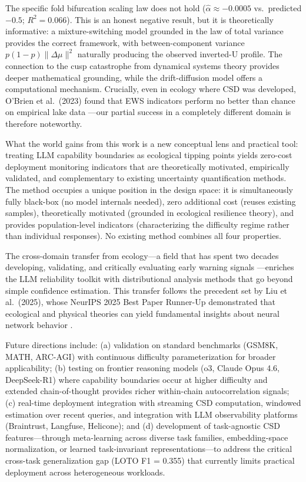 \documentclass[11pt,letterpaper]{article}
\begin{document}
The specific fold bifurcation scaling law does not hold ($\hat{\alpha} \approx -0.0005$ vs.\ predicted $-0.5$; $R^2 = 0.066$). This is an honest negative result, but it is theoretically informative: a mixture-switching model grounded in the law of total variance provides the correct framework, with between-component variance $p(1{-}p)\|\Delta\mu\|^2$ naturally producing the observed inverted-U profile. The connection to the cusp catastrophe from dynamical systems theory provides deeper mathematical grounding, while the drift-diffusion model offers a computational mechanism. Crucially, even in ecology where CSD was developed, O'Brien et al.~(2023) found that EWS indicators perform no better than chance on empirical lake data \cite{obrien2023}---our partial success in a completely different domain is therefore noteworthy.

What the world gains from this work is a new conceptual lens and practical tool: treating LLM capability boundaries as ecological tipping points yields zero-cost deployment monitoring indicators that are theoretically motivated, empirically validated, and complementary to existing uncertainty quantification methods. The method occupies a unique position in the design space: it is simultaneously fully black-box (no model internals needed), zero additional cost (reuses existing samples), theoretically motivated (grounded in ecological resilience theory), and provides population-level indicators (characterizing the difficulty regime rather than individual responses). No existing method combines all four properties.

The cross-domain transfer from ecology---a field that has spent two decades developing, validating, and critically evaluating early warning signals \cite{scheffer2009, obrien2023}---enriches the LLM reliability toolkit with distributional analysis methods that go beyond simple confidence estimation. This transfer follows the precedent set by Liu et al.~(2025), whose NeurIPS 2025 Best Paper Runner-Up demonstrated that ecological and physical theories can yield fundamental insights about neural network behavior \cite{liu2025superposition}.

Future directions include: (a) validation on standard benchmarks (GSM8K, MATH, ARC-AGI) with continuous difficulty parameterization for broader applicability; (b) testing on frontier reasoning models (o3, Claude Opus 4.6, DeepSeek-R1) where capability boundaries occur at higher difficulty and extended chain-of-thought provides richer within-chain autocorrelation signals; (c) real-time deployment integration with streaming CSD computation, windowed estimation over recent queries, and integration with LLM observability platforms (Braintrust, Langfuse, Helicone); and (d) development of task-agnostic CSD features---through meta-learning across diverse task families, embedding-space normalization, or learned task-invariant representations---to address the critical cross-task generalization gap (LOTO F1 = 0.355) that currently limits practical deployment across heterogeneous workloads.



\end{document}
